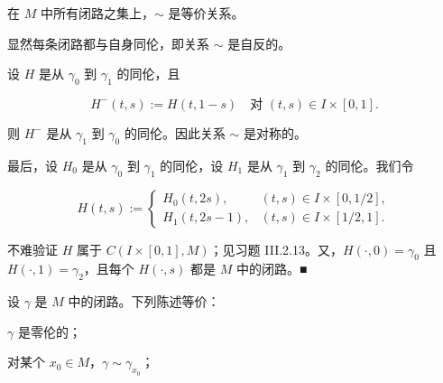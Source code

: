 \begin{remark}

\begin{items}
\item

在 $ M $ 中所有闭路之集上，$ \sim $ 是等价关系。

\proofhead
显然每条闭路都与自身同伦，即关系 $ \sim $ 是自反的。

\begin{subitems}
\item

设 $ H $ 是从 $ \gamma_{0} $ 到 $ \gamma_{1} $ 的同伦，且

\[
H^{-}(t,s) := H(t,1-s) \quad \text{对 } (t,s) \in I\times[0,1] .
\]

则 $ H^{-} $ 是从 $ \gamma_{1} $ 到 $ \gamma_{0} $ 的同伦。因此关系 $ \sim $ 是对称的。

\item

最后，设 $ H_{0} $ 是从 $ \gamma_{0} $ 到 $ \gamma_{1} $ 的同伦，设 $ H_{1} $ 是从 $ \gamma_{1} $ 到 $ \gamma_{2} $ 的同伦。我们令

\begin{equation*}
H(t,s) := \begin{cases} H_{0}(t,2s) , & (t,s) \in I\times[0,1/2] ,\\ H_{1}(t,2s-1) , & (t,s) \in I\times[1/2,1] . \end{cases}
\end{equation*}

不难验证 $ H $ 属于 $ C(I\times[0,1],M) $；见习题 III.2.13。又，$ H(\cdot,0) = \gamma_{0} $ 且 $ H(\cdot,1) = \gamma_{2} $，且每个 $ H(\cdot,s) $ 都是 $ M $ 中的闭路。\nobreak\hspace{0.35em}■

\end{subitems}

\item

设 $ \gamma $ 是 $ M $ 中的闭路。下列陈述等价：

\begin{subitems}
\item

$ \gamma $ 是零伦的；

\item

对某个 $ x_{0} \in M $，$ \gamma \sim \gamma_{x_{0}} $；

\item


\end{subitems}
\end{items}
\end{remark}
